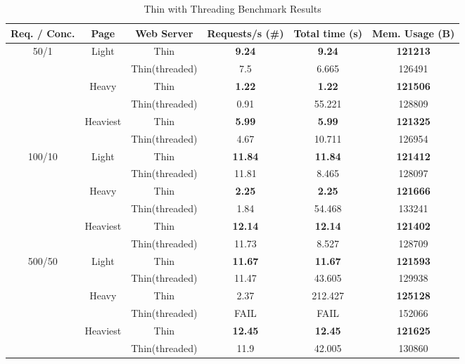 \begin{table}[ht]
  \centering
  \caption{Thin with Threading Benchmark Results}
  \begin{tabular}{|c|c|c|c|c|c|}

\hline
  Req. / Conc. & Page & Web Server & Requests/s (\#) & Total time (s) & Mem. Usage (B) \\ \hline
\multirow{6}{*}{50/1} & \multirow{2}{*}{Light} & Thin & \textbf{9.24} & \textbf{\textbf{9.24}} & \textbf{121213}\\\cline{3-6}
 &  & Thin(threaded) & 7.5 & 6.665 & 126491\\\cline{2-6}
 & \multirow{2}{*}{Heavy} & Thin & \textbf{1.22} & \textbf{\textbf{1.22}} & \textbf{121506}\\\cline{3-6}
 &  & Thin(threaded) & 0.91 & 55.221 & 128809\\\cline{2-6}
 & \multirow{2}{*}{Heaviest} & Thin & \textbf{5.99} & \textbf{\textbf{5.99}} & \textbf{121325}\\\cline{3-6}
 &  & Thin(threaded) & 4.67 & 10.711 & 126954\\\hline
\multirow{6}{*}{100/10} & \multirow{2}{*}{Light} & Thin & \textbf{11.84} & \textbf{\textbf{11.84}} & \textbf{121412}\\\cline{3-6}
 &  & Thin(threaded) & 11.81 & 8.465 & 128097\\\cline{2-6}
 & \multirow{2}{*}{Heavy} & Thin & \textbf{2.25} & \textbf{\textbf{2.25}} & \textbf{121666}\\\cline{3-6}
 &  & Thin(threaded) & 1.84 & 54.468 & 133241\\\cline{2-6}
 & \multirow{2}{*}{Heaviest} & Thin & \textbf{12.14} & \textbf{\textbf{12.14}} & \textbf{121402}\\\cline{3-6}
 &  & Thin(threaded) & 11.73 & 8.527 & 128709\\\hline
\multirow{6}{*}{500/50} & \multirow{2}{*}{Light} & Thin & \textbf{11.67} & \textbf{\textbf{11.67}} & \textbf{121593}\\\cline{3-6}
 &  & Thin(threaded) & 11.47 & 43.605 & 129938\\\cline{2-6}
 & \multirow{2}{*}{Heavy} & Thin & 2.37 & 212.427 & \textbf{125128}\\\cline{3-6}
 &  & Thin(threaded) & FAIL & FAIL & 152066\\\cline{2-6}
 & \multirow{2}{*}{Heaviest} & Thin & \textbf{12.45} & \textbf{\textbf{12.45}} & \textbf{121625}\\\cline{3-6}
 &  & Thin(threaded) & 11.9 & 42.005 & 130860\\\hline

\end{tabular}
\end{table}
